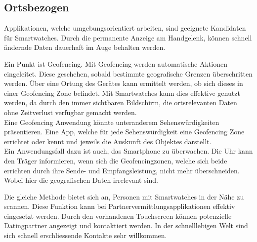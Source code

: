 \subsection{Ortsbezogen}
Applikationen, welche umgebungsorientiert arbeiten, sind geeignete Kandidaten für Smartwatches. Durch die permanente Anzeige am Handgelenk, können schnell ändernde Daten dauerhaft im Auge behalten werden.

Ein Punkt ist Geofencing. Mit Geofencing werden automatische Aktionen eingeleitet. Diese geschehen, sobald bestimmte geografische Grenzen überschritten werden. Über eine Ortung des Gerätes kann ermittelt werden, ob sich dieses in einer Geofencing Zone befindet. Mit Smartwatches kann dies effektive genutzt werden, da durch den immer sichtbaren Bildschirm, die ortsrelevanten Daten ohne Zeitverlust verfügbar gemacht werden.\\
Eine Geofencing Anwendung könnte unteranderem Sehenswürdigkeiten präsentieren. Eine App, welche für jede Sehenswürdigkeit eine Geofencing Zone errichtet oder kennt und jeweils die Auskunft des Objektes darstellt.\\
Ein Anwendungsfall dazu ist auch, das Smartphone zu überwachen. Die Uhr kann den Träger informieren, wenn sich die Geofencingzonen, welche sich beide errichten durch ihre Sende- und Empfangsleistung, nicht mehr überschneiden. Wobei hier die geografischen Daten irrelevant sind.

Die gleiche Methode bietet sich an, Personen mit Smartwatches in der Nähe zu scannen. Diese Funktion kann bei Partnervermittlungsapplikationen effektiv eingesetzt werden. Durch den vorhandenen Touchscreen können potenzielle Datingpartner angezeigt und kontaktiert werden. In der schnelllebigen Welt sind sich schnell erschliessende Kontakte sehr willkommen.

